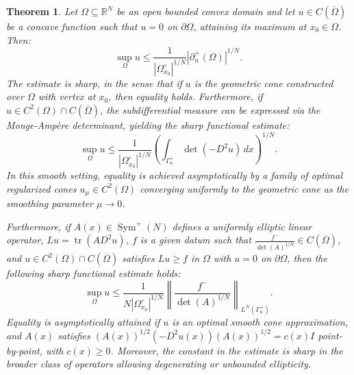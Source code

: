 \documentclass[10pt,a4paper]{amsart}
\newtheorem{theorem}{Theorem}[section]
\numberwithin{equation}{section}
\begin{document}
\begin{theorem}\label{thm5.6}
Let $\Omega \subseteq \mathbb{R}^N$ be an open bounded convex domain and let $u \in C(\overline{\Omega})$ be a concave function such that $u=0$ on $\partial \Omega$, attaining its maximum at $x_0 \in \Omega$. Then:
\begin{equation}\label{eq:sharp_polar_abp}
\sup_\Omega u \le \frac{1}{|\Omega_{x_0}^\circ|^{1/N}} |\partial^+_u(\Omega)|^{1/N}.
\end{equation}
The estimate is sharp, in the sense that if $u$ is the geometric cone constructed over $\Omega$ with vertex at $x_0$, then equality holds. Furthermore, if $u \in C^2(\Omega) \cap C(\overline{\Omega})$, the subdifferential measure can be expressed via the Monge-Ampère determinant, yielding the sharp functional estimate:
\begin{equation}\label{eq:sharp_ma_smooth}
\sup_\Omega u \le \frac{1}{|\Omega_{x_0}^\circ|^{1/N}} \left( \int_{\Gamma^+_u} \det(-D^2u) \, dx \right)^{1/N}.
\end{equation}
In this smooth setting, equality is achieved asymptotically by a family of optimal regularized cones $u_\mu \in C^2(\Omega)$ converging uniformly to the geometric cone as the smoothing parameter $\mu \to 0$.

\noindent Furthermore, if $A(x) \in \operatorname{Sym}^+(N)$ defines a uniformly elliptic linear operator, $Lu = \operatorname{tr}(A D^2u)$, $f$ is a given datum such that $\frac{f^-}{\det(A)^{1/N}} \in C(\overline{\Omega})$, and $u \in C^2(\Omega) \cap C(\overline{\Omega})$ satisfies $Lu \ge f$ in $\Omega$ with $u=0$ on $\partial \Omega$, then the following sharp functional estimate holds:
\begin{equation}\label{eq:ABPN}
\sup_\Omega u \le \frac{1}{N|\Omega^\circ_{x_0}|^{1/N}} \left\| \frac{f^-}{\det(A)^{1/N}} \right\|_{L^N(\Gamma^+_u)}.
\end{equation}
Equality is asymptotically attained if $u$ is an optimal smooth cone approximation, and $A(x)$ satisfies $(A(x))^{1/2}(-D^2u(x))(A(x))^{1/2} = c(x)I$ point-by-point, with $c(x) \ge 0$. Moreover, the constant in the estimate is sharp in the broader class of operators allowing degenerating or unbounded ellipticity.
\end{theorem}
\end{document}
